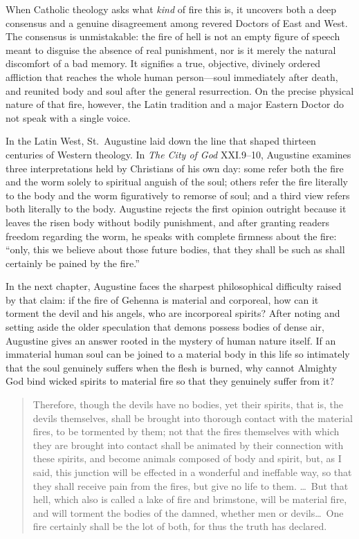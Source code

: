 When Catholic theology asks what \textit{kind} of fire this is, it uncovers both a deep consensus and a genuine disagreement among revered Doctors of East and West. The consensus is unmistakable: the fire of hell is not an empty figure of speech meant to disguise the absence of real punishment, nor is it merely the natural discomfort of a bad memory. It signifies a true, objective, divinely ordered affliction that reaches the whole human person---soul immediately after death, and reunited body and soul after the general resurrection. On the precise physical nature of that fire, however, the Latin tradition and a major Eastern Doctor do not speak with a single voice.

In the Latin West, St.\ Augustine laid down the line that shaped thirteen centuries of Western theology. In \textit{The City of God} XXI.9--10, Augustine examines three interpretations held by Christians of his own day: some refer both the fire and the worm solely to spiritual anguish of the soul; others refer the fire literally to the body and the worm figuratively to remorse of soul; and a third view refers both literally to the body. Augustine rejects the first opinion outright because it leaves the risen body without bodily punishment, and after granting readers freedom regarding the worm, he speaks with complete firmness about the fire: ``only, this we believe about those future bodies, that they shall be such as shall certainly be pained by the fire.''

In the next chapter, Augustine faces the sharpest philosophical difficulty raised by that claim: if the fire of Gehenna is material and corporeal, how can it torment the devil and his angels, who are incorporeal spirits? After noting and setting aside the older speculation that demons possess bodies of dense air, Augustine gives an answer rooted in the mystery of human nature itself. If an immaterial human soul can be joined to a material body in this life so intimately that the soul genuinely suffers when the flesh is burned, why cannot Almighty God bind wicked spirits to material fire so that they genuinely suffer from it?

\begin{quote}
Therefore, though the devils have no bodies, yet their spirits, that is, the devils themselves, shall be brought into thorough contact with the material fires, to be tormented by them; not that the fires themselves with which they are brought into contact shall be animated by their connection with these spirits, and become animals composed of body and spirit, but, as I said, this junction will be effected in a wonderful and ineffable way, so that they shall receive pain from the fires, but give no life to them. \dots\ But that hell, which also is called a lake of fire and brimstone, will be material fire, and will torment the bodies of the damned, whether men or devils\dots\ One fire certainly shall be the lot of both, for thus the truth has declared.
\end{quote}

